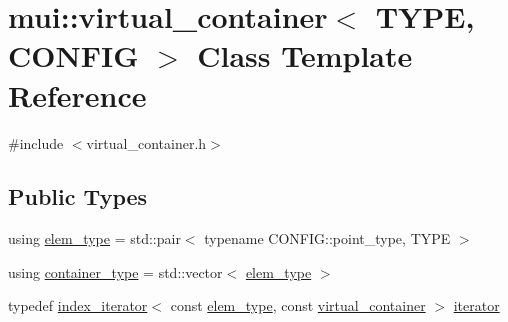 \hypertarget{classmui_1_1virtual__container}{}\section{mui\+:\+:virtual\+\_\+container$<$ T\+Y\+PE, C\+O\+N\+F\+IG $>$ Class Template Reference}
\label{classmui_1_1virtual__container}


{\ttfamily \#include $<$virtual\+\_\+container.\+h$>$}

\subsection*{Public Types}
\begin{DoxyCompactItemize}
\item 
using \hyperlink{classmui_1_1virtual__container_a5539ad526cf676a5852858dd8da7eca2}{elem\+\_\+type} = std\+::pair$<$ typename C\+O\+N\+F\+I\+G\+::point\+\_\+type, T\+Y\+PE $>$
\item 
using \hyperlink{classmui_1_1virtual__container_a4f84af2177deb7ad3664c6f5935164be}{container\+\_\+type} = std\+::vector$<$ \hyperlink{classmui_1_1virtual__container_a5539ad526cf676a5852858dd8da7eca2}{elem\+\_\+type} $>$
\item 
typedef \hyperlink{structmui_1_1index__iterator}{index\+\_\+iterator}$<$ const \hyperlink{classmui_1_1virtual__container_a5539ad526cf676a5852858dd8da7eca2}{elem\+\_\+type}, const \hyperlink{classmui_1_1virtual__container}{virtual\+\_\+container} $>$ \hyperlink{classmui_1_1virtual__container_ab8a791b2f30b5a59f0bcc06b417d10fc}{iterator}
\end{DoxyCompactItemize}
